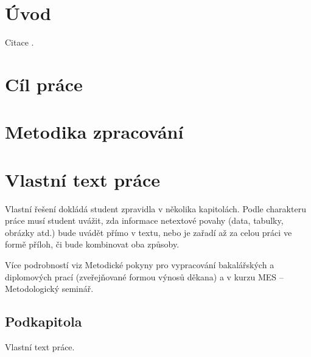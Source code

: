\section{Úvod}


Citace \cite{abadi_tensorflow:_2016, lacey_deep_2016}.


\section{Cíl práce}



\section{Metodika zpracování}



\section{Vlastní text práce}


Vlastní řešení dokládá student zpravidla v několika kapitolách. Podle charakteru práce musí student uvážit, zda informace netextové povahy (data, tabulky, obrázky atd.) bude uvádět přímo v textu, nebo je zařadí až za celou práci ve formě příloh, či bude kombinovat oba způsoby. 

Více podrobností viz Metodické pokyny pro vypracování bakalářských a diplomových prací (zveřejňované formou výnosů děkana) a v kurzu MES – Metodologický seminář. 

\subsection{Podkapitola}

Vlastní text práce.


